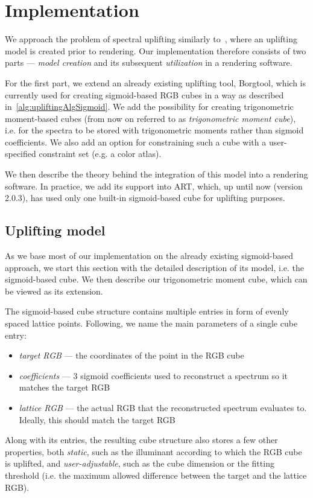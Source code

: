 \chapter{Implementation} \label{chap:implementation}

We approach the problem of spectral uplifting similarly to~\citet{upsamplingJakobHanika}, where an uplifting model is created prior to rendering. Our implementation therefore consists of two parts --- \emph{model creation} and its subsequent \emph{utilization} in a rendering software. 

For the first part, we extend an already existing uplifting tool, Borgtool, which is currently used for creating sigmoid-based RGB cubes in a way as described in~\cref{alg:upliftingAlgSigmoid}. We add the possibility for creating trigonometric moment-based cubes (from now on referred to as \emph{trigonometric moment cube}), i.e. for the spectra to be stored with trigonometric moments rather than sigmoid coefficients. We also add an option for constraining such a cube with a user-specified constraint set (e.g. a color atlas).

We then describe the theory behind the integration of this model into a rendering software. In practice, we add its support into ART, which, up until now (version 2.0.3), has used only one built-in sigmoid-based cube for uplifting purposes.

\section{Uplifting model}

As we base most of our implementation on the already existing sigmoid-based approach, we start this section with the detailed description of its model, i.e. the sigmoid-based cube. We then describe our trigonometric moment cube, which can be viewed as its extension.

The sigmoid-based cube structure contains multiple entries in form of evenly spaced lattice points. Following, we name the main parameters of a single cube entry:
\begin{itemize}
	\item \emph{target RGB} --- the coordinates of the point in the RGB cube
	\item \emph{coefficients} --- 3 sigmoid coefficients used to reconstruct a spectrum so it matches the target RGB
	\item \emph{lattice RGB} --- the actual RGB that the reconstructed spectrum evaluates to. Ideally, this should match the target RGB
\end{itemize}
Along with its entries, the resulting cube structure also stores a few other properties, both \emph{static}, such as the illuminant according to which the RGB cube is uplifted, and \emph{user-adjustable}, such as the cube dimension or the fitting threshold (i.e. the maximum allowed difference between the target and the lattice RGB).


